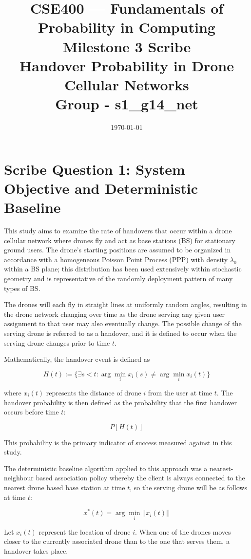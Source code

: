 \documentclass[12pt,a4paper]{article}
\title{CSE400 --- Fundamentals of Probability in Computing\\
Milestone 3 Scribe\\
Handover Probability in Drone Cellular Networks\\
Group - s1\_g14\_net}
\date{\today}
\begin{document}
\maketitle
\thispagestyle{empty}


\section{Scribe Question 1: System Objective and Deterministic Baseline}

This study aims to examine the rate of handovers that occur within a drone cellular network where drones fly and act as base stations (BS) for stationary ground users. The drone's starting positions are assumed to be organized in accordance with a homogeneous Poisson Point Process (PPP) with density $\lambda_0$ within a BS plane; this distribution has been used extensively within stochastic geometry and is representative of the randomly deployment pattern of many types of BS.

The drones will each fly in straight lines at uniformly random angles, resulting in the drone network changing over time as the drone serving any given user assignment to that user may also eventually change. The possible change of the serving drone is referred to as a handover, and it is defined to occur when the serving drone changes prior to time $t$.

Mathematically, the handover event is defined as

\[
H(t) := \{\exists s < t : \arg\min_i x_i(s) \neq \arg\min_i x_i(t)\}
\]

where $x_i(t)$ represents the distance of drone $i$ from the user at time $t$. The handover probability is then defined as the probability that the first handover occurs before time $t$:

\[
P[H(t)]
\]

This probability is the primary indicator of success measured against in this study.

The deterministic baseline algorithm applied to this approach was a nearest-neighbour based association policy whereby the client is always connected to the nearest drone based base station at time $t$, so the serving drone will be as follows at time $t$:

\[
x^*(t) = \arg \min_i ||x_i(t)||
\]

Let $x_i(t)$ represent the location of drone $i$. When one of the drones moves closer to the currently associated drone than to the one that serves them, a handover takes place.
\end{document}
